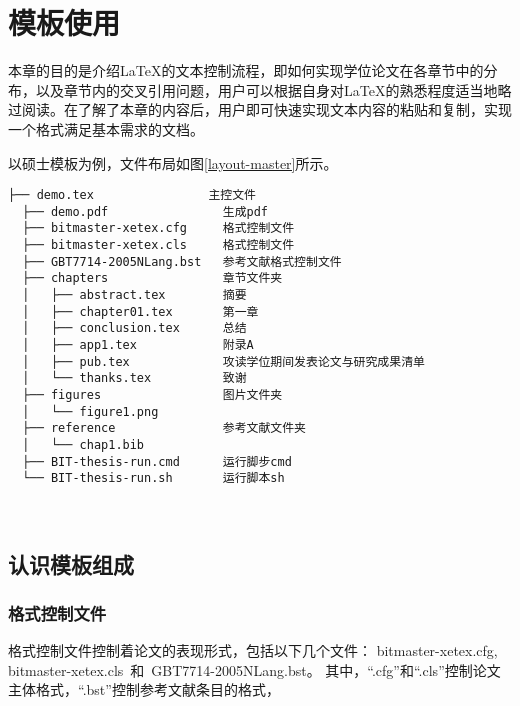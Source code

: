 
\chapter{模板使用}
\label{chap:textStructure}

本章的目的是介绍\LaTeX{}的文本控制流程，即如何实现学位论文在各章节中的分布，以及章节内的交叉引用问题，用户可以根据自身对\LaTeX{}的熟悉程度适当地略过阅读。在了解了本章的内容后，用户即可快速实现文本内容的粘贴和复制，实现一个格式满足基本需求的文档。

以硕士模板为例，文件布局如图\ref{layout-master}所示。

\begin{lstlisting}[basicstyle=\small\ttfamily,caption={BIT-thesis-template-master 模板文件布局},label=layout-master,numbers=none]
  ├── demo.tex                主控文件
  ├── demo.pdf                生成pdf
  ├── bitmaster-xetex.cfg     格式控制文件
  ├── bitmaster-xetex.cls     格式控制文件
  ├── GBT7714-2005NLang.bst   参考文献格式控制文件
  ├── chapters                章节文件夹
  │   ├── abstract.tex        摘要
  │   ├── chapter01.tex       第一章
  │   ├── conclusion.tex      总结
  │   ├── app1.tex            附录A
  │   ├── pub.tex             攻读学位期间发表论文与研究成果清单
  │   └── thanks.tex          致谢
  ├── figures                 图片文件夹
  │   └── figure1.png   
  ├── reference               参考文献文件夹
  │   └── chap1.bib
  ├── BIT-thesis-run.cmd      运行脚步cmd
  └── BIT-thesis-run.sh       运行脚本sh
  
      
\end{lstlisting}

\section{认识模板组成}

\subsection{格式控制文件}
\label{sec:format}

格式控制文件控制着论文的表现形式，包括以下几个文件：
bitmaster-xetex.cfg, bitmaster-xetex.cls~和~GBT7714-2005NLang.bst。
其中，``.cfg''和``.cls''控制论文主体格式，``.bst''控制参考文献条目的格式，

